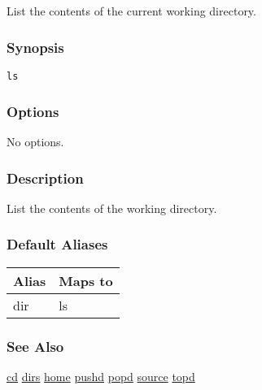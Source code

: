 \subsection{}
\label{ls}
List the contents of the current working directory. 
\subsubsection*{Synopsis}
\begin{verbatim}
ls
\end{verbatim}
\subsubsection*{Options}
 No options. 
\subsubsection*{Description}
 List the contents of the working directory. 
\subsubsection*{Default Aliases}
\begin{tabular}{|l|l|}
\hline 
 Alias  & Maps to  \\
 \hline 
 dir  & ls  \\
 \hline 
\end{tabular}
\subsubsection*{See Also}
\hyperref[cd]{cd} \hyperref[dirs]{dirs} \hyperref[home]{home} \hyperref[pushd]{pushd} \hyperref[popd]{popd} \hyperref[source]{source} \hyperref[topd]{topd} 